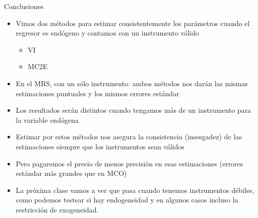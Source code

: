 \documentclass[10pt]{beamer}
\begin{document}
\begin{frame}{Conclusiones}
    \begin{itemize}
        \item Vimos dos métodos para estimar consistentemente los parámetros cuando el regresor es endógeno y contamos con un instrumento válido
        \begin{itemize}
            \item VI
            \item MC2E
        \end{itemize}
        \item En el MRS, con un sólo instrumento: ambos métodos nos darán las mismas estimaciones puntuales y los mismos errores estándar
        \item Los resultados serán distintos cuando tengamos más de un instrumento para la variable endógena
        \item Estimar por estos métodos nos asegura la consistencia (insesgadez) de las estimaciones siempre que los instrumentos sean válidos
        \item Pero pagaremos el precio de menos precisión en esas estimaciones (errores estándar más grandes que en MCO)
        \item La próxima clase vamos a ver que pasa cuando tenemos instrumentos débiles, como podemos testear si hay endogeneidad y en algunos casos incluso la restricción de exogeneidad.
    \end{itemize}
\end{frame}
\end{document}
